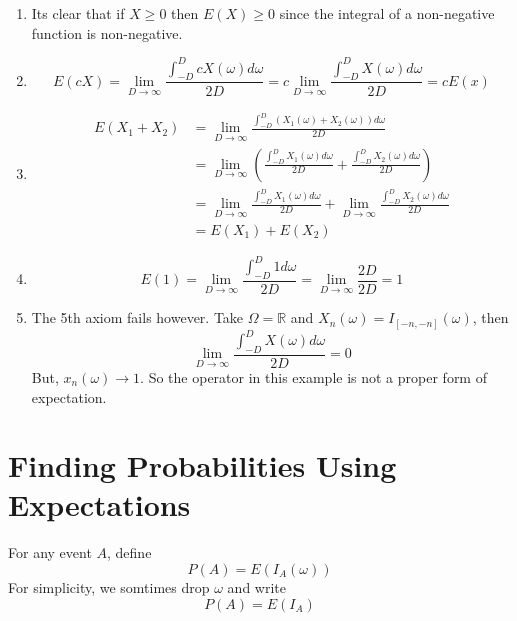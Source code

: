 \documentclass[openany]{report}
\begin{document}
\begin{enumerate}
    \item Its clear that if $X \geq 0$ then $E(X) \geq 0$ since the integral of a non-negative function is non-negative.
    \item 
    \[E(cX) = \lim_{D \rightarrow \infty} \frac{\int_{-D}^D cX(\omega) d\omega}{2D} = c\lim_{D \rightarrow \infty}\frac{\int_{-D}^DX(\omega)d\omega}{2D} =  cE(x)\]
    \item 
    \begin{align*}
        E(X_1 + X_2) &= \lim_{D \rightarrow \infty} \frac{\int_{-D}^D (X_1(\omega) + X_2(\omega)) d\omega}{2D}\\
        &=\lim_{D \rightarrow \infty} \left(\frac{\int_{-D}^D X_1(\omega) d\omega}{2D} + \frac{\int_{-D}^D X_2(\omega) d\omega}{2D}\right)\\
        &=\lim_{D \rightarrow \infty} \frac{\int_{-D}^D X_1(\omega) d\omega}{2D} + \lim_{D \rightarrow \infty}\frac{\int_{-D}^D X_2(\omega) d\omega}{2D}\\
        &= E(X_1) + E(X_2)
    \end{align*}
    \item 
    \[E(1) = \lim_{D \rightarrow \infty} \frac{\int_{-D}^D 1 d \omega}{2D} = \lim_{D\rightarrow \infty} \frac{2D}{2D} = 1\]
    \item 
    The 5th axiom fails however. Take $\Omega = \mathbb{R}$ and $X_n (\omega) = I_{[-n,-n]}(\omega)$, then 
    \[\lim_{D \rightarrow \infty} \frac{\int_{-D}^D X(\omega)d\omega}{2D} = 0\]
    But, $x_n(\omega) \rightarrow 1$. So the operator in this example is not a proper form of expectation. 
\end{enumerate}
\section{Finding Probabilities Using Expectations}
\begin{definition}
    For any event $A$, define 
    \[P(A) = E(I_A(\omega))\]
    For simplicity, we somtimes drop $\omega$ and write 
    \[P(A) = E(I_A)\]
\end{definition}
\end{document}
